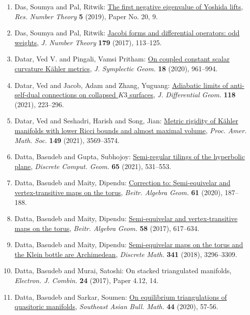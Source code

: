 \begin{enumerate}
{2 in prime powers}, \emph{Acta Arith.} {\bf 183} (2018), 167--172.
\item Das, Soumya and Pal, Ritwik: \href{https://doi.org/10.1007/s40993-019-0158-x}{The first negative eigenvalue of {Y}oshida lifts}, \emph{Res. Number Theory} {\bf 5} (2019), Paper No. 20, 9.
\item Das, Soumya and Pal, Ritwik: \href{https://doi.org/10.1016/j.jnt.2017.03.021}{Jacobi forms and differential operators: odd weights}, \emph{J. Number Theory} {\bf 179} (2017), 113--125.
\item Datar, Ved V. and Pingali, Vamsi Pritham: \href{https://doi.org/10.4310/JSG.2020.v18.n4.a1}{On coupled constant scalar curvature {K}\"{a}hler metrics}, \emph{J. Symplectic Geom.} {\bf 18} (2020), 961--994.
\item Datar, Ved and Jacob, Adam and Zhang, Yuguang: \href{https://doi.org/10.4310/jdg/1622743140}{Adiabatic limits of anti-self-dual connections on collapsed
{$K3$} surfaces}, \emph{J. Differential Geom.} {\bf 118} (2021), 223--296.
\item Datar, Ved and Seshadri, Harish and Song, Jian: \href{https://doi.org/10.1090/proc/15473}{Metric rigidity of {K}\"{a}hler manifolds with lower {R}icci
bounds and almost maximal volume}, \emph{Proc. Amer. Math. Soc.} {\bf 149} (2021), 3569--3574.
\item Datta, Basudeb and Gupta, Subhojoy: \href{https://doi.org/10.1007/s00454-019-00156-0}{Semi-regular tilings of the hyperbolic plane}, \emph{Discrete Comput. Geom.} {\bf 65} (2021), 531--553.
\item Datta, Basudeb and Maity, Dipendu: \href{https://doi.org/10.1007/s13366-019-00458-7}{Correction to: {S}emi-equivelar and vertex-transitive maps on
the torus}, \emph{Beitr. Algebra Geom.} {\bf 61} (2020), 187--188.
\item Datta, Basudeb and Maity, Dipendu: \href{https://doi.org/10.1007/s13366-017-0332-z}{Semi-equivelar and vertex-transitive maps on the torus}, \emph{Beitr. Algebra Geom.} {\bf 58} (2017), 617--634.
\item Datta, Basudeb and Maity, Dipendu: \href{https://doi.org/10.1016/j.disc.2018.08.016}{Semi-equivelar maps on the torus and the {K}lein bottle are
{A}rchimedean}, \emph{Discrete Math.} {\bf 341} (2018), 3296--3309.
\item Datta, Basudeb and Murai, Satoshi: On stacked triangulated manifolds, \emph{Electron. J. Combin.} {\bf 24} (2017), Paper 4.12, 14.
\item Datta, Basudeb and Sarkar, Soumen: \href{https://doi.org/10.1007/jhep01(2020)036}{On equilibrium triangulations of quasitoric manifolds}, \emph{Southeast Asian Bull. Math.} {\bf 44} (2020), 57-56.

\end{enumerate}
